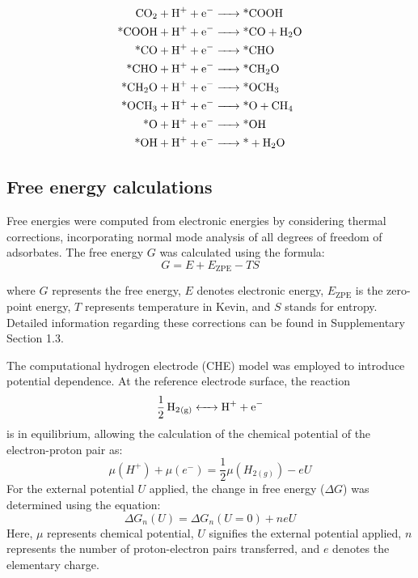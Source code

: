 \begin{equation*}
\begin{aligned}
\ce{CO2 + H+ + e- &-> \text{*}COOH} \\
\ce{\text{*}COOH + H+ + e- &-> \text{*}CO + H2O} \\
\ce{\text{*}CO + H+ + e- &-> \text{*}CHO} \\
\ce{\text{*}CHO + H+ + e- &-> \text{*}CH2O} \\
\ce{\text{*}CH2O + H+ + e- &-> \text{*}OCH3} \\
\ce{\text{*}OCH3 + H+ + e- &-> \text{*}O + CH4} \\
\ce{\text{*}O + H+ + e- &-> \text{*}OH} \\
\ce{\text{*}OH + H+ + e- &-> \text{*} + H2O}
\end{aligned}
\end{equation*}


\subsection{Free energy calculations}
Free energies were computed from electronic energies by considering thermal corrections, incorporating normal mode analysis of all degrees of freedom of adsorbates.
The free energy $\textit{G}$ was calculated using the formula:
\begin{equation*}
G = E + E_{\text{ZPE}} - TS
\end{equation*}

where $\textit{G}$ represents the free energy, $\textit{E}$ denotes electronic energy, $\textit{E}_{\text{ZPE}}$ is the zero-point energy, $\textit{T}$ represents temperature in Kevin, and $\textit{S}$ stands for entropy.
Detailed information regarding these corrections can be found in Supplementary Section 1.3.

The computational hydrogen electrode (CHE) model \cite{peterson2010copper, norskov2004origin} was employed to introduce potential dependence.
At the reference electrode surface, the reaction
\begin{equation*}
\ce{1/2H2_{(g)}  <-> H+ + e-}
\end{equation*}
is in equilibrium, allowing the calculation of the chemical potential of the electron-proton pair as:
\begin{equation*}
\mu(H^+) + \mu(e^-) = \frac{1}{2}\mu(H_{2(g)}) - eU
\end{equation*}
For the external potential $\textit{U}$ applied, the change in free energy ($\Delta \textit{G}$) was determined using the equation:
\begin{equation*}
\Delta G_n(U) = \Delta G_n(U=0) + neU
\end{equation*}
Here, $\mu$ represents chemical potential, $\textit{U}$ signifies the external potential applied, $\textit{n}$ represents the number of proton-electron pairs transferred, and $\textit{e}$ denotes the elementary charge.


